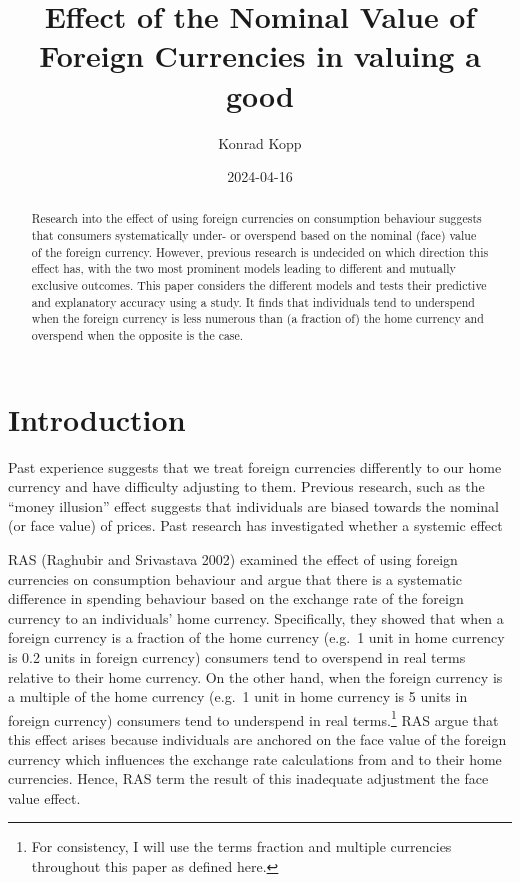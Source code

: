 \documentclass[
]{report}
\title{Effect of the Nominal Value of Foreign Currencies in valuing a
good}
\author{Konrad Kopp}
\affil{%
                  University of Oxford
              }
\date{2024-04-16}
\renewcommand*\contentsname{Table of contents}
\newcommand\contentsname{Table of contents}
\begin{document}
\maketitle
\begin{abstract}
Research into the effect of using foreign currencies on consumption
behaviour suggests that consumers systematically under- or overspend
based on the nominal (face) value of the foreign currency. However,
previous research is undecided on which direction this effect has, with
the two most prominent models leading to different and mutually
exclusive outcomes. This paper considers the different models and tests
their predictive and explanatory accuracy using a study. It finds that
individuals tend to underspend when the foreign currency is less
numerous than (a fraction of) the home currency and overspend when the
opposite is the case.
\end{abstract}

\renewcommand*\contentsname{Table of contents}
{
\hypersetup{linkcolor=}
\setcounter{tocdepth}{2}
\tableofcontents
}
\chapter{Introduction}\label{introduction}

Past experience suggests that we treat foreign currencies differently to
our home currency and have difficulty adjusting to them. Previous
research, such as the ``money illusion'' effect suggests that
individuals are biased towards the nominal (or face value) of prices.
Past research has investigated whether a systemic effect

RAS (Raghubir and Srivastava 2002) examined the effect of using foreign
currencies on consumption behaviour and argue that there is a systematic
difference in spending behaviour based on the exchange rate of the
foreign currency to an individuals' home currency. Specifically, they
showed that when a foreign currency is a fraction of the home currency
(e.g.~1 unit in home currency is 0.2 units in foreign currency)
consumers tend to overspend in real terms relative to their home
currency. On the other hand, when the foreign currency is a multiple of
the home currency (e.g.~1 unit in home currency is 5 units in foreign
currency) consumers tend to underspend in real terms.\footnote{For
  consistency, I will use the terms fraction and multiple currencies
  throughout this paper as defined here.} RAS argue that this effect
arises because individuals are anchored on the face value of the foreign
currency which influences the exchange rate calculations from and to
their home currencies. Hence, RAS term the result of this inadequate
adjustment the face value effect.
\end{document}
